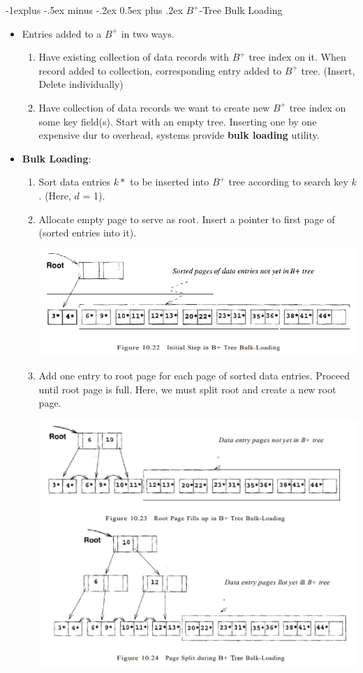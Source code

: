 \documentclass[10pt, landscape]{article}
\makeatletter
\renewcommand{\subsection}{\@startsection{subsection}{2}{0mm}%
                                {-1explus -.5ex minus -.2ex}%
                                {0.5ex plus .2ex}%
                                {\normalfont\normalsize\bfseries}}
\makeatother
\begin{document}
\begin{multicols*}{3}
\columnbreak

\subsection{$B^+$-Tree Bulk Loading}
\begin{itemize}
\item Entries added to a $B^+$ in two ways.
	\begin{enumerate}
	\item Have existing collection of data records with $B^+$ tree index on it. When record added to collection, corresponding entry added to $B^+$ tree. (Insert, Delete individually)
	\item Have collection of data records we want to create new $B^+$ tree index on some key field(s). Start with an empty tree. Inserting one by one expensive dur to overhead, systems provide \textbf{bulk loading} utility.
	\end{enumerate}
\item \textbf{Bulk Loading}: 
	\begin{enumerate}
	\item Sort data entries $k*$ to be inserted into $B^+$ tree according to search key $k$. (Here, $d$ = 1).
	\item Allocate empty page to serve as root. Insert a pointer to first page of (sorted entries into it).
	\centerline{\includegraphics[width = 0.8\linewidth]{bulkloading1}}
	\item Add one entry to root page for each page of sorted data entries. Proceed until root page is full. Here, we must split root and create a new root page.
	\centerline{\includegraphics[width = 0.8\linewidth]{bulkloading2}}

\end{enumerate}
\end{itemize}
\end{multicols*}
\end{document}
